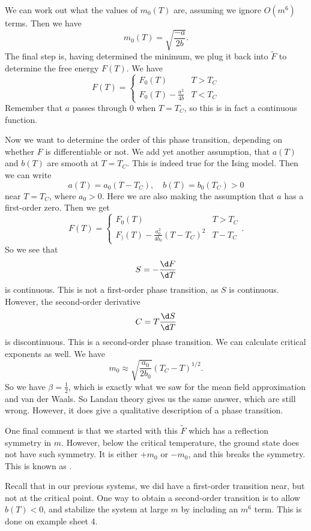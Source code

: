 \documentclass[a4paper]{article}
\begin{document}
We can work out what the values of $m_0(T)$ are, assuming we ignore $O(m^6)$ terms. Then we have
\[
  m_0(T) = \sqrt{\frac{-a}{2b}}.
\]
The final step is, having determined the minimum, we plug it back into $\tilde{F}$ to determine the free energy $F(T)$. We have
\[
  F(T) =
  \begin{cases}
    F_0(T) & T > T_C\\
    F_0(T) - \frac{a^2}{4b} & T < T_C
  \end{cases}
\]
Remember that $a$ passes through $0$ when $T = T_C$, so this is in fact a continuous function.

Now we want to determine the order of this phase transition, depending on whether $F$ is differentiable or not. We add yet another assumption, that $a(T)$ and $b(T)$ are smooth at $T = T_C$. This is indeed true for the Ising model. Then we can write
\[
  a(T) = a_0(T - T_C),\quad b(T) = b_0(T_C) > 0
\]
near $T = T_C$, where $a_0 > 0$. Here we are also making the assumption that $a$ has a first-order zero. Then we get
\[
  F(T) =
  \begin{cases}
    F_0(T) & T > T_C\\
    F_)(T) - \frac{a_0^2}{4b_0}(T - T_C)^2 & T - T_C
  \end{cases}.
\]
So we see that
\[
  S = - \frac{\d F}{\d T}
\]
is continuous. This is not a first-order phase transition, as $S$ is continuous. However, the second-order derivative
\[
  C = T \frac{\d S}{\d T}
\]
is discontinuous. This is a second-order phase transition. We can calculate critical exponents as well. We have
\[
  m_0 \approx \sqrt{\frac{a_0}{2 b_0}} (T_C - T)^{1/2}.
\]
So we have $\beta = \frac{1}{2}$, which is exactly what we saw for the mean field approximation and van der Waals. So Landau theory gives us the same answer, which are still wrong. However, it does give a qualitative description of a phase transition.

One final comment is that we started with this $\tilde{F}$ which has a reflection symmetry in $m$. However, below the critical temperature, the ground state does not have such symmetry. It is either $+m_0$ or $- m_0$, and this breaks the symmetry. This is known as .

Recall that in our previous systems, we did have a first-order transition near, but not at the critical point. One way to obtain a second-order transition is to allow $b(T) < 0$, and stabilize the system at large $m$ by including an $m^6$ term. This is done on example sheet 4.
\end{document}
